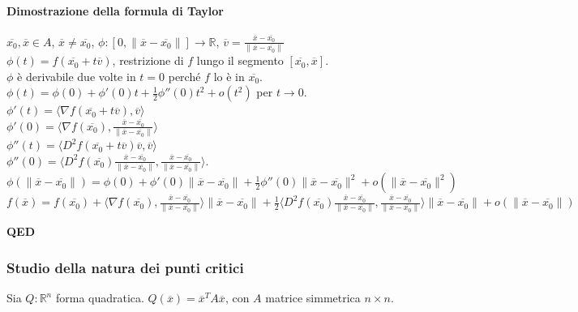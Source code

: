 \documentclass{article}
\newcommand{\R}{\mathbb{R}}
\begin{document}
\paragraph{{Dimostrazione della formula di Taylor}}
$\overline{x_0}, \overline{x}\in A$, $\overline{x}\neq \overline{x_0}$, $\phi:[0, \|\overline{x}-\overline{x_0}\|]\rightarrow \R$, $\overline{v}=\frac{\overline{x}-\overline{x_0}}{\|\overline{x}-\overline{x_0}\|}$\\
$\phi(t)=f(\overline{x_0}+t\overline{v})$, restrizione di $f$ lungo il segmento $[\overline{x_0},\overline{x}]$.\\
$\phi$ è derivabile due volte in $t=0$ perché $f$ lo è in $\overline{x_0}$.\\
$\phi(t)=\phi(0)+\phi'(0)t+\frac{1}{2}\phi''(0)t^2+o(t^2)$ per $t \rightarrow 0$.\\
$\phi'(t)=\langle\nabla f(\overline{x_0}+t\overline{v}),\overline{v}\rangle$\\
$\phi'(0)=\langle \nabla f(\overline{x_0}), \frac{\overline{x}-\overline{x_0}}{\|\overline{x}-\overline{x_0}\|}\rangle$\\
$\phi''(t)=\langle D^2f(\overline{x_0}+t\overline{v})\overline{v},\overline{v} \rangle$\\
$\phi''(0)=\langle D^2 f(\overline{x_0})\frac{\overline{x}-\overline{x_0}}{\|\overline{x}-\overline{x_0}\|}, \frac{\overline{x}-\overline{x_0}}{\|\overline{x}-\overline{x_0}\|}\rangle$.\\
$\phi(\|\overline{x}-\overline{x_0}\|)=\phi(0)+\phi'(0) \|\overline{x}-\overline{x_0}\|+\frac{1}{2}\phi''(0)\| \overline{x}-\overline{x_0}\|^2+o(\|\overline{x}-\overline{x_0}\|^2)$\\
$f(\overline{x})=f(\overline{x_0})+\langle \nabla f(\overline{x_0}), \frac{\overline{x}-\overline{x_0}}{\|\overline{x}-\overline{x_0}\|} \rangle \|\overline{x} -\overline{x_0}\|+ \frac{1}{2}\langle D^2 f(\overline{x_0})\frac{\overline{x}-\overline{x_0}}{\|\overline{x}-\overline{x_0}\|},\frac{\overline{x}-\overline{x_0}}{\|\overline{x}-\overline{x_0}\|}  \rangle \|\overline{x}-\overline{x_0}\|+o(\|\overline{x}-\overline{x_0}\|)$
\begin{flushright}
\textbf{QED}
\end{flushright}

\subsubsection{{Studio della natura dei punti critici}}
Sia $Q: \R^n$ forma quadratica. $Q(\overline{x})=\overline{x}^T A \overline{x}$, con $A$ matrice simmetrica $n\times n$.
\end{document}
